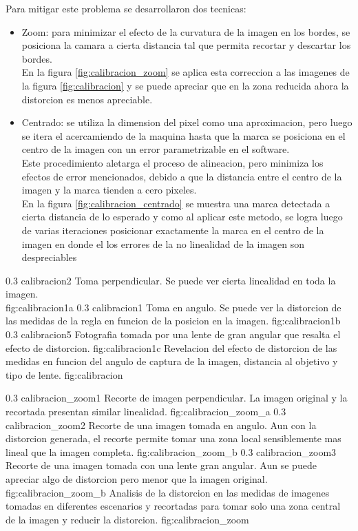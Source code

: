 Para mitigar este problema se desarrollaron dos tecnicas:
\begin{itemize}
\item{Zoom: para minimizar el efecto de la curvatura de la imagen en los bordes, se posiciona la camara a cierta distancia tal que permita recortar y descartar los bordes.\\
      En la figura \ref{fig:calibracion_zoom} se aplica esta correccion a las imagenes de la figura \ref{fig:calibracion} y se puede apreciar que en la zona reducida ahora la distorcion es menos apreciable.}
   \item{Centrado: se utiliza la dimension del pixel como una aproximacion, pero luego se itera el acercamiendo de la maquina hasta que la marca se posiciona en el centro de la imagen con un error parametrizable en el software.\\
         Este procedimiento aletarga el proceso de alineacion, pero minimiza los efectos de error mencionados, debido a que la distancia entre el centro de la imagen y la marca tienden a cero pixeles.\\
         En la figura \ref{fig:calibracion_centrado} se muestra una marca detectada a cierta distancia de lo esperado y como al aplicar este metodo, se logra luego de varias iteraciones posicionar exactamente la marca en el centro de la imagen en donde el los errores de la no linealidad de la imagen son despreciables}
   \end{itemize}


\subfigabc
   {0.3} {calibracion2} {Toma perpendicular. Se puede ver cierta linealidad en toda la imagen.\\ \vphantom{1}} {fig:calibracion1a}
   {0.3} {calibracion1} {Toma en angulo. Se puede ver la distorcion de las medidas de la regla en funcion de la posicion en la imagen.} {fig:calibracion1b}
   {0.3} {calibracion5} {Fotografia tomada por una lente de gran angular que resalta el efecto de distorcion.} {fig:calibracion1c}
   {Revelacion del efecto de distorcion de las medidas en funcion del angulo de captura de la imagen, distancia al objetivo y tipo de lente.}
   {fig:calibracion}

\subfigabc
   {0.3} {calibracion_zoom1} {Recorte de imagen perpendicular. La imagen original y la recortada presentan similar linealidad.} {fig:calibracion_zoom_a}
   {0.3} {calibracion_zoom2} {Recorte de una imagen tomada en angulo. Aun con la distorcion generada, el recorte permite tomar una zona local sensiblemente mas lineal que la imagen completa.} {fig:calibracion_zoom_b}
   {0.3} {calibracion_zoom3} {Recorte de una imagen tomada con una lente gran angular. Aun se puede apreciar algo de distorcion pero menor que la imagen original.} {fig:calibracion_zoom_b}
   {Analisis de la distorcion en las medidas de imagenes tomadas en diferentes escenarios y recortadas para tomar solo una zona central de la imagen y reducir la distorcion.}
   {fig:calibracion_zoom}

